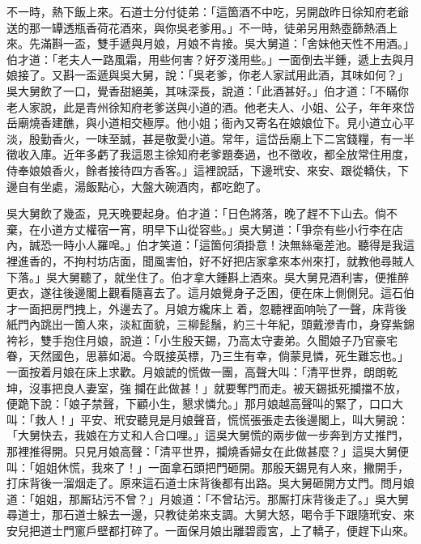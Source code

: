 不一時，熱下飯上來。石道士分付徒弟：「這箇酒不中吃，另開啟昨日徐知府老爺送的那一罈透瓶香荷花酒來，與你吳老爹用。」不一時，徒弟另用熱壺篩熱酒上來。先滿斟一盃，雙手遞與月娘，{}月娘不肯接。吳大舅道：「舍妹他天性不用酒。」伯才道：「老夫人一路風霜，用些何害？好歹淺用些。」一面倒去半鍾，遞上去與月娘接了。又斟一盃遞與吳大舅，說：「吳老爹，你老人家試用此酒，其味如何？」吳大舅飲了一口，覺香甜絕美，其味深長，說道：「此酒甚好。」伯才道：「不瞞你老人家說，此是青州徐知府老爹送與小道的酒。他老夫人、小姐、公子，年年來岱岳廟燒香建醮，與小道相交極厚。他小姐；衙內又寄名在娘娘位下。見小道立心平淡，殷勤香火，一味至誠，甚是敬愛小道。常年，這岱岳廟上下二宮錢糧，有一半徵收入庫。近年多虧了我這恩主徐知府老爹題奏過，也不徵收，都全放常住用度，侍奉娘娘香火，餘者接待四方香客。」{}這裡說話，下邊玳安、來安、跟從轎伕，下邊自有坐處，湯飯點心，大盤大碗酒肉，都吃飽了。

吳大舅飲了幾盃，見天晚要起身。伯才道：「日色將落，晚了趕不下山去。{}倘不棄，在小道方丈權宿一宵，明早下山從容些。」吳大舅道：「爭奈有些小行李在店內，誠恐一時小人羅唣。」伯才笑道：「這箇何須掛意！決無絲毫差池。聽得是我這裡進香的，不拘村坊店面，聞風害怕，好不好把店家拿來本州來打，就教他尋賊人下落。」{}吳大舅聽了，就坐住了。伯才拿大鍾斟上酒來。吳大舅見酒利害，便推醉更衣，{}遂往後邊閣上觀看隨喜去了。這月娘覺身子乏困，便在床上側側兒。這石伯才一面把房門拽上，外邊去了。月娘方纔床上𢱉着，忽聽裡面响喨了一聲，床背後紙門內跳出一箇人來，淡紅面貌，三柳髭鬚，約三十年紀，頭戴滲青巾，身穿紫錦袴衫，雙手抱住月娘，說道：「小生殷天錫，乃高太守妻弟。久聞娘子乃官豪宅眷，天然國色，思慕如渴。今既接英標，乃三生有幸，倘蒙見憐，死生難忘也。」{}一面按着月娘在床上求歡。月娘諕的慌做一團，高聲大叫：「清平世界，朗朗乾坤，沒事把良人妻室，強𢺞攔在此做甚！」就要奪門而走。被天錫抵死攔擋不放，便跪下說：「娘子禁聲，下顧小生，懇求憐允。」{}那月娘越高聲叫的緊了，口口大叫：「救人！」平安、玳安聽見是月娘聲音，慌慌張張走去後邊閣上，叫大舅說：「大舅快去，我娘在方丈和人合口哩。」這吳大舅慌的兩步做一步奔到方丈推門，那裡推得開。只見月娘高聲：「清平世界，攔燒香婦女在此做甚麼？」這吳大舅便叫：「姐姐休慌，我來了！」一面拿石頭把門砸開。那殷天錫見有人來，撇開手，打床背後一溜烟走了。原來這石道士床背後都有出路。吳大舅砸開方丈門。問月娘道：「姐姐，那厮玷污不曾？」月娘道：「不曾玷污。那厮打床背後走了。」吳大舅尋道士，那石道士躲去一邊，只教徒弟來支調。大舅大怒，喝令手下跟隨玳安、來安兒把道士門窻戶壁都打碎了。一面保月娘出離碧霞宮，上了轎子，便趕下山來。

